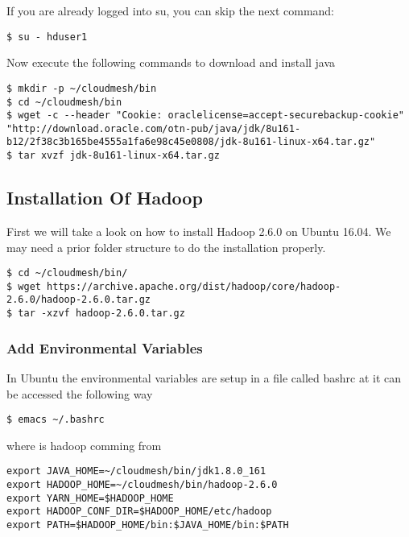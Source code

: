 If you are already logged into su, you can skip the next command:

\begin{lstlisting}
$ su - hduser1
\end{lstlisting}

Now execute the following commands to download and install java

\begin{lstlisting}
$ mkdir -p ~/cloudmesh/bin
$ cd ~/cloudmesh/bin
$ wget -c --header "Cookie: oraclelicense=accept-securebackup-cookie" "http://download.oracle.com/otn-pub/java/jdk/8u161-b12/2f38c3b165be4555a1fa6e98c45e0808/jdk-8u161-linux-x64.tar.gz"
$ tar xvzf jdk-8u161-linux-x64.tar.gz
\end{lstlisting}

\subsection{Installation Of Hadoop}\label{installation-of-hadoop}

First we will take a look on how to install Hadoop 2.6.0 on Ubuntu
16.04. We may need a prior folder structure to do the installation
properly.

\begin{lstlisting}
$ cd ~/cloudmesh/bin/
$ wget https://archive.apache.org/dist/hadoop/core/hadoop-2.6.0/hadoop-2.6.0.tar.gz
$ tar -xzvf hadoop-2.6.0.tar.gz
\end{lstlisting}

\subsubsection{Add Environmental
Variables}\label{add-environmental-variables}

In Ubuntu the environmental variables are setup in a file called bashrc
at it can be accessed the following way

\begin{lstlisting}
$ emacs ~/.bashrc

\end{lstlisting}

where is hadoop comming from

\begin{lstlisting}
export JAVA_HOME=~/cloudmesh/bin/jdk1.8.0_161
export HADOOP_HOME=~/cloudmesh/bin/hadoop-2.6.0
export YARN_HOME=$HADOOP_HOME
export HADOOP_CONF_DIR=$HADOOP_HOME/etc/hadoop
export PATH=$HADOOP_HOME/bin:$JAVA_HOME/bin:$PATH
\end{lstlisting}

